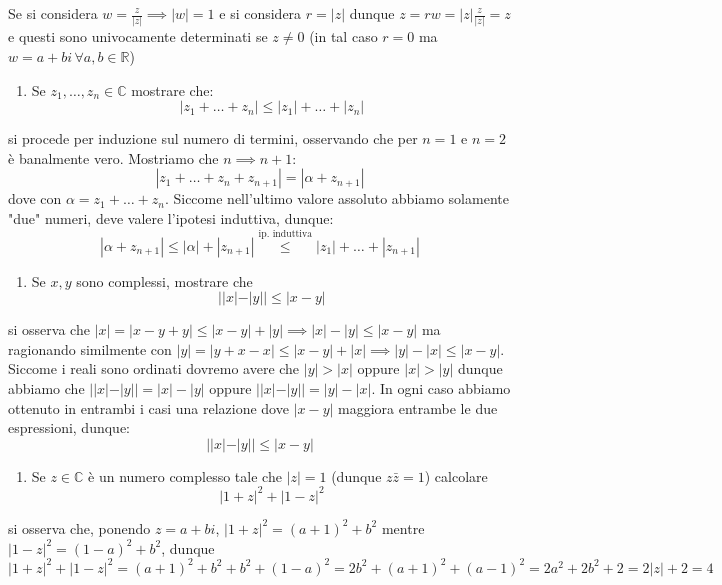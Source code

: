 \documentclass{report}
\begin{document}
\begin{mysolution}
	Se si considera $w=\frac{z}{|z|} \implies |w|=1$ e si considera $r=|z|$ dunque $z = rw = |z| \frac{z}{|z|} = z$ e questi sono univocamente determinati se $z \neq 0$ (in tal caso $r=0$ ma $w=a+bi \, \forall a, b \in \mathbb{R}$)
\end{mysolution}
\begin{enumerate}[resume, label=\protect\circled{\arabic*}]
	\item Se $z_1, \ldots, z_n \in \mathbb{C}$ mostrare che:
	$$
	|z_1 + \ldots + z_n| \leq |z_1| + \ldots + |z_n|
	$$
\end{enumerate}
\begin{mysolution}
si procede per induzione sul numero di termini, osservando che per $n=1$ e $n=2$ è banalmente vero. Mostriamo che $n \implies n+1$:
$$
|z_1 + \ldots + z_n + z_{n+1}| = |\alpha + z_{n+1}|
$$
dove con $\alpha=z_1 + \ldots + z_n$. Siccome nell'ultimo valore assoluto abbiamo solamente "due" numeri, deve valere l'ipotesi induttiva, dunque:
$$
	|\alpha + z_{n+1}| \leq |\alpha| + |z_{n+1}| \stackrel{\text{ip. induttiva}}{\leq} |z_1| + \ldots + |z_{n+1}|
$$
\end{mysolution}
\begin{enumerate}[resume, label=\protect\circled{\arabic*}]
	\item Se $x, y$ sono complessi, mostrare che 
	$$
	||x|-|y|| \leq |x-y|
	$$
\end{enumerate}
\begin{mysolution} si osserva che $|x| = |x-y+y| \leq |x-y| + |y| \implies |x|-|y| \leq |x-y|$ ma ragionando similmente con $|y| = |y+x-x| \leq |x-y| + |x| \implies |y|-|x| \leq |x-y|$. Siccome i reali sono ordinati dovremo avere che $|y|>|x|$ oppure $|x|>|y|$ dunque abbiamo che $||x|-|y|| = |x|-|y|$ oppure $||x|-|y||=|y|-|x|$. In ogni caso abbiamo ottenuto in entrambi i casi una relazione dove $|x-y|$ maggiora entrambe le due espressioni, dunque:
$$
	||x|-|y|| \leq |x-y|
$$
\end{mysolution}
\begin{enumerate}[resume, label=\protect\circled{\arabic*}]
	\item Se $z \in \mathbb{C}$ è un numero complesso tale che $|z|=1$ (dunque $z\bar{z}=1$) calcolare
	$$
	|1+z|^2 + |1-z|^2
	$$
\end{enumerate}
\begin{mysolution}
si osserva che, ponendo $z=a+bi$, $|1+z|^2 = (a+1)^2 + b^2$ mentre $|1-z|^2 = (1-a)^2 + b^2$, dunque
$$
	|1+z|^2 + |1-z|^2 = (a+1)^2 + b^2 + b^2 + (1-a)^2 = 2b^2 + (a+1)^2 + (a-1)^2 = 2a^2 + 2b^2 + 2 = 2|z|+2 = 4
$$
\end{mysolution}
\end{document}
